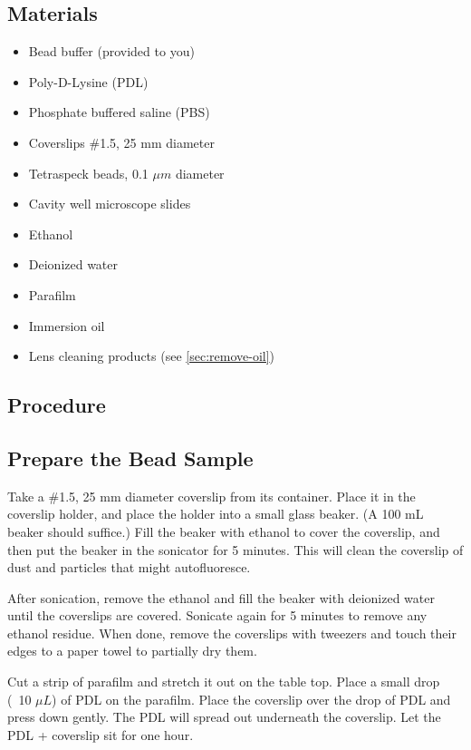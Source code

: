 \documentclass[10pt,a4paper,oneside]{book}
\begin{document}
\subsection{Materials}

\begin{itemize}
    \item{Bead buffer (provided to you)}
    \item{Poly-D-Lysine (PDL)}
    \item{Phosphate buffered saline (PBS)}
    \item{Coverslips \#1.5, 25 mm diameter}
    \item{Tetraspeck beads, 0.1 $\mu m$ diameter}
    \item{Cavity well microscope slides}
    \item{Ethanol}
    \item{Deionized water}
    \item{Parafilm}
    \item{Immersion oil}
    \item{Lens cleaning products (see \autoref{sec:remove-oil})}
\end{itemize}

\subsection{Procedure}

\subsection{Prepare the Bead Sample}

Take a \#1.5, 25 mm diameter coverslip from its container. Place it in the coverslip holder, and place the holder into a small glass beaker. (A 100 mL beaker should suffice.) Fill the beaker with ethanol to cover the coverslip, and then put the beaker in the sonicator for 5 minutes. This will clean the coverslip of dust and particles that might autofluoresce.

After sonication, remove the ethanol and fill the beaker with deionized water until the coverslips are covered. Sonicate again for 5 minutes to remove any ethanol residue. When done, remove the coverslips with tweezers and touch their edges to a paper towel to partially dry them.

Cut a strip of parafilm and stretch it out on the table top. Place a small drop (~10 $\mu L$) of PDL on the parafilm. Place the coverslip over the drop of PDL and press down gently. The PDL will spread out underneath the coverslip. Let the PDL + coverslip sit for one hour.
\end{document}
